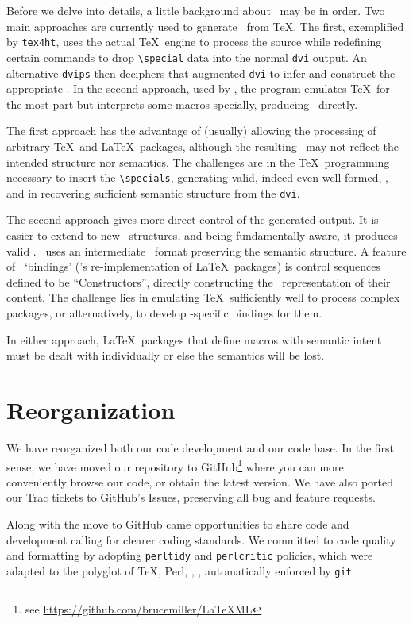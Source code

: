 \documentclass{llncs}
\begin{document}
Before we delve into details, a little background about \LaTeXML\ may be in order.
Two main approaches are currently used to generate
\HTML\ from \TeX. The first, exemplified by \texttt{tex4ht}, uses the actual \TeX\ engine
to process the source while redefining certain commands to drop
\verb|\special| data into the normal \texttt{dvi} output.
An alternative \texttt{dvips} then deciphers that augmented \texttt{dvi}
to infer and construct the appropriate \HTML.
In the second approach, used by \LaTeXML, the program
emulates \TeX\ for the most part but interprets some macros
specially, producing \XML\ directly.

The first approach has the advantage of (usually)
allowing the processing of arbitrary \TeX\ and \LaTeX\ packages,
although the resulting \HTML\ may not reflect the intended
structure nor semantics.
The challenges are in the \TeX\ programming necessary to
insert the \verb|\specials|, generating valid, indeed even well-formed, \HTML,
and in recovering sufficient semantic structure from the \texttt{dvi}.

The second approach gives more direct control of the generated output.
It is easier to extend to new \XML\ structures,
and being fundamentally {\XML} aware, it produces valid \XML.
\LaTeXML\ uses an intermediate \XML\ format preserving the semantic structure. 
A feature of \LaTeXML\ `bindings' (\LaTeXML's re-implementation
of \LaTeX\ packages) is control sequences defined to be ``Constructors'',
directly constructing the \XML\ representation of their content.
The challenge lies in emulating \TeX\ sufficiently well to
process complex packages, or alternatively, to
develop \LaTeXML-specific bindings for them.

In either approach, \LaTeX\ packages that define
macros with semantic intent must be dealt with
individually or else the semantics will be lost.

\section{Reorganization}\label{reorganization}
We have reorganized both our code development and our code base.
In the first sense, we have moved our repository to GitHub\footnote{see \url{https://github.com/brucemiller/LaTeXML}} 
where you can more conveniently browse our code, or obtain the latest version.
We have also ported our Trac tickets to GitHub's Issues,
preserving all bug and feature requests.

Along with the move to GitHub came opportunities to share
code and development calling for clearer coding standards.
We committed to code quality and formatting by
adopting \texttt{perltidy} and \texttt{perlcritic} policies,
which were adapted to the polyglot of \TeX, Perl, \XML,
\XSLT, automatically enforced by \texttt{git}.
\end{document}
